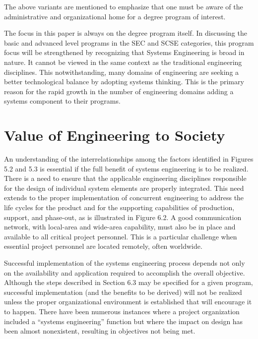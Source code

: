 The above variants are mentioned to emphasize that one must be aware of the administrative and organizational home for a degree program of interest.

The focus in this paper is always on the degree program itself. In discussing the basic and advanced level programs in the SEC and SCSE categories, this program focus will be strengthened by recognizing that Systems Engineering is broad in nature. It cannot be viewed in the same context as the traditional engineering disciplines. This notwithstanding, many domains of engineering are seeking a better technological balance by adopting systems thinking. This is the primary reason for the rapid growth in the number of engineering domains adding a systems component to their programs.


\section{Value of Engineering to Society}

An understanding of the interrelationships among the factors identified in Figures 5.2 and 5.3 is essential if the full benefit of systems engineering is to be realized. There is a need to ensure that the applicable engineering disciplines responsible for the design of individual system elements are properly integrated. This need extends to the proper implementation of concurrent engineering to address the life cycles for the product and for the supporting capabilities of production, support, and phase-out, as is illustrated in Figure 6.2. A good communication network, with local-area and wide-area capability, must also be in place and available to all critical project personnel. This is a particular challenge when essential project personnel are located remotely, often worldwide.

Successful implementation of the systems engineering process depends not only on the availability and application required to accomplish the overall objective. Although the steps described in Section 6.3 may be specified for a given program, successful implementation (and the benefits to be derived) will not be realized unless the proper organizational environment is established that will encourage it to happen. There have been numerous instances where a project organization included a “systems engineering” function but where the impact on design has been almost nonexistent, resulting in objectives not being met.

